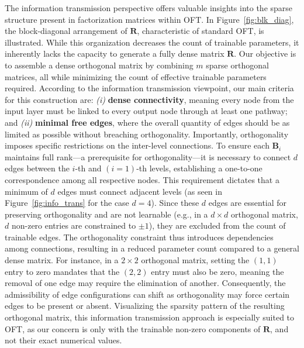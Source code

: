 The information transmission perspective offers valuable insights into the sparse structure present in factorization matrices within OFT. In Figure~\ref{fig:blk_diag}, the block-diagonal arrangement of $\bm{R}$, characteristic of standard OFT, is illustrated. While this organization decreases the count of trainable parameters, it inherently lacks the capacity to generate a fully dense matrix $\bm{R}$. Our objective is to assemble a dense orthogonal matrix by combining $m$ sparse orthogonal matrices, all while minimizing the count of effective trainable parameters required. According to the information transmission viewpoint, our main criteria for this construction are: \emph{(i)} \textbf{dense connectivity}, meaning every node from the input layer must be linked to every output node through at least one pathway; and \emph{(ii)} \textbf{minimal free edges}, where the overall quantity of edges should be as limited as possible without breaching orthogonality. Importantly, orthogonality imposes specific restrictions on the inter-level connections. To ensure each $\bm{B}_i$ maintains full rank—a prerequisite for orthogonality—it is necessary to connect $d$ edges between the $i$-th and $(i=1)$-th levels, establishing a one-to-one correspondence among all respective nodes. This requirement dictates that a minimum of $d$ edges must connect adjacent levels (as seen in Figure~\ref{fig:info_trans} for the case $d=4$). Since these $d$ edges are essential for preserving orthogonality and are not learnable (e.g., in a $d \times d$ orthogonal matrix, $d$ non-zero entries are constrained to $\pm 1$), they are excluded from the count of trainable edges. The orthogonality constraint thus introduces dependencies among connections, resulting in a reduced parameter count compared to a general dense matrix. For instance, in a $2\times 2$ orthogonal matrix, setting the $(1,1)$ entry to zero mandates that the $(2,2)$ entry must also be zero, meaning the removal of one edge may require the elimination of another. Consequently, the admissibility of edge configurations can shift as orthogonality may force certain edges to be present or absent. Visualizing the sparsity pattern of the resulting orthogonal matrix, this information transmission approach is especially suited to OFT, as our concern is only with the trainable non-zero components of $\bm{R}$, and not their exact numerical values.

